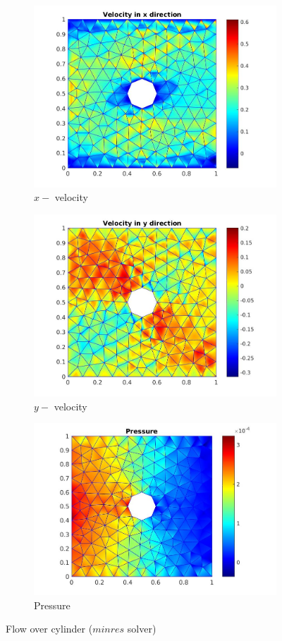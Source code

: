 \documentclass[a4paper,twoside,openright]{book}
\begin{document}
\begin{figure}
\begin{subfigure}{\textwidth}	
  \includegraphics[width=0.8\linewidth]{cylinder_minres_vx.jpg}
    \caption{$x-$ velocity}
    \label{x_vel_stoke_minres}
\end{subfigure}
\begin{subfigure}{\textwidth}	
    \includegraphics[width=0.8\linewidth]{cylinder_minres_vy.jpg}
    \caption{$y-$ velocity}
     \label{y_vel_stoke_minres}
\end{subfigure}
\begin{subfigure}{\textwidth}	
    \includegraphics[width=0.8\linewidth]{cylinder_minres_pressure.jpg}
    \caption{Pressure}
      \label{pressure_stoke_minres}
\end{subfigure}
\caption{Flow over cylinder ($minres$ solver)}
\label{flow_over_cylinder_minres}
\end{figure}
\end{document}
